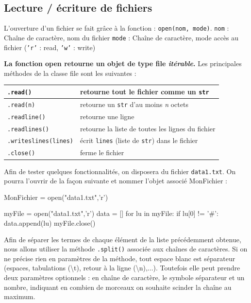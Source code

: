 \documentclass[a4paper,11pt,titlepage]{report}
\begin{document}
\subsection{Lecture / écriture de fichiers}

L'ouverture d'un fichier se fait grâce à la fonction : \texttt{open(nom, mode)}.
\texttt{nom} : Chaîne de caractère, nom du fichier
\texttt{mode} : Chaîne de caractère, mode accès au fichier (\texttt{'r'} : read, \texttt{'w'} : write)

\textbf{La fonction open retourne un objet de type file \textit{itérable}.} 
Les principales méthodes de la classe file sont les suivantes :
 
\vspace{0.5cm}
\begin{tabular}{|l|l|}
    \hline
     \texttt{.read()}  & retourne tout le fichier comme un \texttt{str}  \\
    \hline
     \texttt{.read(n)}  & retourne un \texttt{str} d'au moins \textit{n} octets  \\
    \hline
     \texttt{.readline()}  & retourne une ligne  \\
    \hline
     \texttt{.readlines()}  & retourne la liste de toutes les lignes du fichier  \\
    \hline
     \texttt{.writeslines(lines)}  & écrit \texttt{lines} (liste de \texttt{str}) dans le fichier  \\
    \hline
     \texttt{.close()}  & ferme le fichier  \\
    \hline
\end{tabular}
\vspace{0.5cm}

Afin de tester quelques fonctionnalités, on disposera du fichier \texttt{data1.txt}. On pourra l'ouvrir de la façon suivante et nommer l'objet associé \og MonFichier \fg{} :
\begin{codePython}
MonFichier = open("data1.txt",'r')
\end{codePython}


\begin{codePython}
myFile = open("data1.txt",'r')
data = []                  
for lu in myFile:
   if lu[0] != '#':
      data.append(lu)
myFile.close()
\end{codePython}

Afin de séparer les termes de chaque élément de la liste précédemment obtenue, nous allons utiliser la méthode \texttt{.split()} associée aux chaînes de caractères. Si on ne précise rien en paramètres de la méthode, tout espace blanc est séparateur (espaces, tabulations (\textbackslash t), retour à la ligne (\textbackslash n),...). Toutefois elle peut prendre deux paramètres optionnels : en chaîne de caractère, le symbole séparateur et un nombre, indiquant en combien de morceaux on souhaite scinder la chaîne au maximum.
\vspace{0.5cm}
\end{document}
